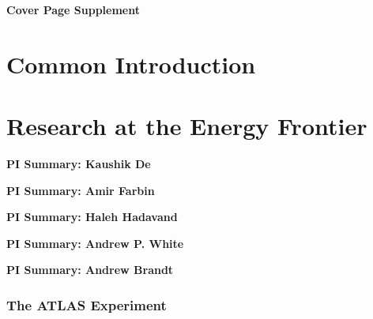 \documentclass[11pt,english]{article}
\def\overhead#1{\part{#1}}
\def\onehead#1{\section{#1}}
\def\centerhead#1{
	\begin{center}
	\Large\textbf{#1}
	\end{center}}
\begin{document}
\pagestyle{empty}
\baselineskip=23pt
\normalsize

\noindent

%


\newpage

\centerhead{Cover Page Supplement}

\newpage

\pagestyle{plain}
\setcounter{page}{1}


\overhead{Common Introduction}

\newpage


\overhead{Research at the Energy Frontier}



\centerhead{PI Summary: Kaushik De}


\centerhead{PI Summary: Amir Farbin}


\centerhead{PI Summary: Haleh Hadavand}


\centerhead{PI Summary: Andrew P. White}


\centerhead{PI Summary: Andrew Brandt}



\onehead{The ATLAS Experiment}
\end{document}
